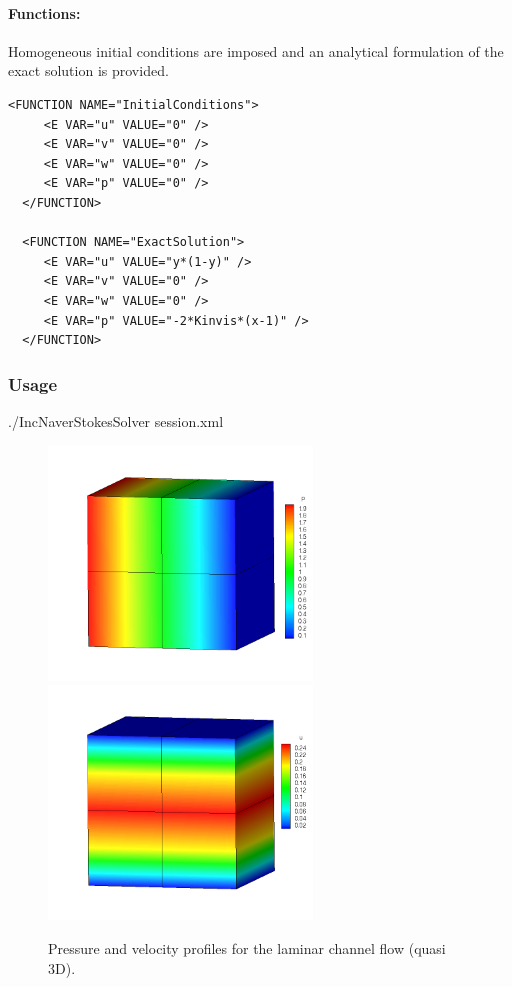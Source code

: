 \paragraph{Functions:~} Homogeneous initial conditions are imposed and an analytical formulation of the exact solution is provided.
\begin{lstlisting}[style=XMLStyle]
  <FUNCTION NAME="InitialConditions">
     <E VAR="u" VALUE="0" />
     <E VAR="v" VALUE="0" />
     <E VAR="w" VALUE="0" />
     <E VAR="p" VALUE="0" />
  </FUNCTION>

  <FUNCTION NAME="ExactSolution">
     <E VAR="u" VALUE="y*(1-y)" />
     <E VAR="v" VALUE="0" />
     <E VAR="w" VALUE="0" />
     <E VAR="p" VALUE="-2*Kinvis*(x-1)" />
  </FUNCTION>
\end{lstlisting}

\subsubsection{Usage}
./IncNaverStokesSolver session.xml

\begin{figure}
\begin{center}
\includegraphics[width=7cm]{Figures/CF3DCVP3PR.png}
\includegraphics[width=7cm]{Figures/CF3DCVP3.png}
\caption{Pressure and velocity profiles for the laminar channel flow (quasi 3D).}
\end{center}
\end{figure}

